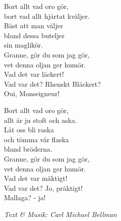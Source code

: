 \vspace{10pt}
Bort allt vad oro gör,\\
bort vad allt hjärtat kväljer.\\
Bäst att man väljer\\
bland dessa buteljer\\
sin maglikör.\\
Granne, gör du som jag gör,\\
vet denna oljan ger humör.\\
Vad det var läckert!\\
Vad var det? Rhenskt Bläckert?\\
Oui, Monseigneur!\par
\vspace{10pt}
Bort allt vad oro gör,\\
allt är ju stoft och aska.\\
Låt oss bli raska\\
och tömma vår flaska\\
bland bröderna.\\
Granne, gör du som jag gör,\\
vet denna oljan ger humör.\\
Vad det var mäktigt!\\
Vad var det? Jo, präktigt!\\
Mallaga? - ja!\par
\vspace{10pt}
{\footnotesize\textit{Text \& Musik: Carl Michael Bellman}}
